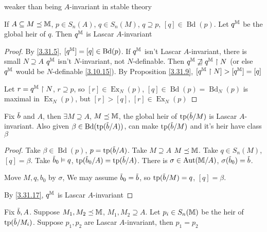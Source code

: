 \documentclass[11pt]{article}
\DeclareMathOperator{\Ex}{Ex}
\DeclareMathOperator{\Bd}{Bd}
\begin{document}
weaker than being \(A\)-invariant in stable theory

\begin{lemma}[]
\label{3.31.17}
If \(A\subseteq M\preceq\mathbb{M}\), \(p\in S_n(A)\), \(q\in S_n(M)\), \(q\supseteq p\), \([q]\in\Bd(p)\). Let \(q^{\mathbb{M}}\) be the
global heir of \(q\). Then \(q^{\mathbb{M}}\) is Lascar \(A\)-invariant
\end{lemma}

\begin{proof}
By \ref{3.31.5}, \([q^{\M}]=[q]\in\Bd(p)\). If \(q^{\mathbb{M}}\) isn't Lascar \(A\)-invariant, there is
small \(N\supseteq A\) \(q^{\mathbb{M}}\) isn't \(N\)-invariant, not \(N\)-definable.
Then \(q^{\mathbb{M}}\not\sqsupseteq q^{\mathbb{M}}\upharpoonright N\) (or else \(q^{\mathbb{M}}\) would be \(N\)-definable \ref{3.10.15}). By Proposition \ref{3.31.9}, \([q^{\mathbb{M}}\upharpoonright N]>[q^{\mathbb{M}}]=[q]\)

Let \(r=q^{\mathbb{M}}\upharpoonright N\), \(r\supseteq p\), so \([r]\in\Ex_N(p)\), \([q]\in\Bd(p)=\Bd_N(p)\) is maximal
in \(\Ex_N(p)\), but \([r]>[q]\), \([r]\in\Ex_N(p)\)
\end{proof}

\begin{lemma}[]
\label{3.31.18}
Fix \(\barb\) and \(A\), then \(\exists M\supseteq A\), \(M\preceq\mathbb{M}\), the global heir of \(\tp(\barb/M)\) is
Lascar \(A\)-invariant. Also given \(\beta\in\Bd(\tp(\barb/A))\), can make \(\tp(\barb/M)\) and it's
heir have class \(\beta\)
\end{lemma}

\begin{proof}
Take \(\beta\in\Bd(p)\), \(p=\tp(\barb/A)\). Take \(M\supseteq A\) \(M\preceq\mathbb{M}\). Take \(q\in S_n(M)\), \([q]=\beta\).
Take \(\barb_0\vDash q\), \(\tp(\barb_0/A)=\tp(\barb/A)\). There
is \(\sigma\in\operatorname{\text{Aut}}(\mathbb{M}/A)\), \(\sigma(\barb_0)=\barb\).

Move \(M,q,b_0\) by \(\sigma\), We may assume \(\barb_0=\barb\), so \(\tp(\barb/M)=q\), \([q]=\beta\).

By \ref{3.31.17}, \(q^{\mathbb{M}}\) is Lascar \(A\)-invariant
\end{proof}

\begin{lemma}[]
\label{3.31.19}
Fix \(\barb,A\). Suppose \(M_1,M_2\preceq\mathbb{M}\), \(M_1,M_2\supseteq A\). Let \(p_i\in S_n(\mathbb{M})\) be the heir
of \(\tp(\barb/M_i)\). Suppose \(p_1,p_2\) are Lascar \(A\)-invariant, then \(p_1=p_2\)
\end{lemma}
\end{document}
